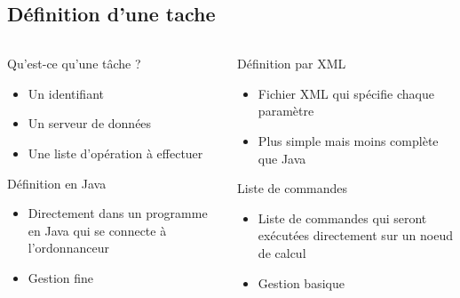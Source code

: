 \documentclass[handout]{beamer}
\begin{document}
\subsection{Définition d'une tache}
\begin{frame}
	\begin{columns}
	\begin{column}[l]{0.5\linewidth}
        \begin{block}{Qu'est-ce qu'une t\^ache ?}
            \begin{itemize}
                \item Un identifiant
                \item Un serveur de données
                \item Une liste d'opération à effectuer %
            \end{itemize}
        \end{block}
        \begin{exampleblock}{Définition en Java}
            \begin{itemize}
                \item Directement dans un programme en Java qui se connecte à l'ordonnanceur
                \item Gestion fine
            \end{itemize}
        \end{exampleblock}
	\end{column}
	\begin{column}[r]{0.5\linewidth}
        \begin{exampleblock}{Définition par XML}
            \begin{itemize}
                \item Fichier XML qui spécifie chaque paramètre
                \item Plus simple mais moins complète que Java
            \end{itemize}
        \end{exampleblock}
        \begin{exampleblock}{Liste de commandes}%
            \begin{itemize}
                \item Liste de commandes qui seront exécutées directement sur un noeud de calcul
                \item Gestion basique
            \end{itemize}
        \end{exampleblock}
	\end{column}
	\end{columns}
\end{frame}
\end{document}
